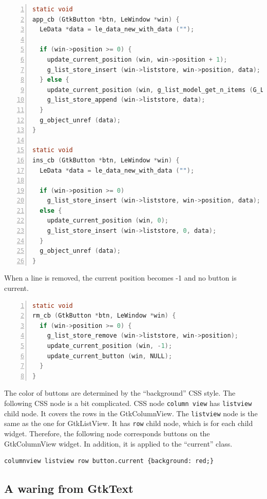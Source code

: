 \begin{lstlisting}[language=C, numbers=left]
static void
app_cb (GtkButton *btn, LeWindow *win) {
  LeData *data = le_data_new_with_data ("");

  if (win->position >= 0) {
    update_current_position (win, win->position + 1);
    g_list_store_insert (win->liststore, win->position, data);
  } else {
    update_current_position (win, g_list_model_get_n_items (G_LIST_MODEL (win->liststore)));
    g_list_store_append (win->liststore, data);
  }
  g_object_unref (data);
}

static void
ins_cb (GtkButton *btn, LeWindow *win) {
  LeData *data = le_data_new_with_data ("");

  if (win->position >= 0)
    g_list_store_insert (win->liststore, win->position, data);
  else {
    update_current_position (win, 0);
    g_list_store_insert (win->liststore, 0, data);
  }
  g_object_unref (data);
}
\end{lstlisting}

When a line is removed, the current position becomes -1 and no button is
current.

\begin{lstlisting}[language=C, numbers=left]
static void
rm_cb (GtkButton *btn, LeWindow *win) {
  if (win->position >= 0) {
    g_list_store_remove (win->liststore, win->position);
    update_current_position (win, -1);
    update_current_button (win, NULL);
  }
}
\end{lstlisting}

The color of buttons are determined by the ``background'' CSS style. The
following CSS node is a bit complicated. CSS node
\passthrough{\lstinline!column view!} has
\passthrough{\lstinline!listview!} child node. It covers the rows in the
GtkColumnView. The \passthrough{\lstinline!listview!} node is the same
as the one for GtkListView. It has \passthrough{\lstinline!row!} child
node, which is for each child widget. Therefore, the following node
corresponds buttons on the GtkColumnView widget. In addition, it is
applied to the ``current'' class.

\begin{lstlisting}
columnview listview row button.current {background: red;}
\end{lstlisting}

\subsection{A waring from GtkText}\label{a-waring-from-gtktext}

